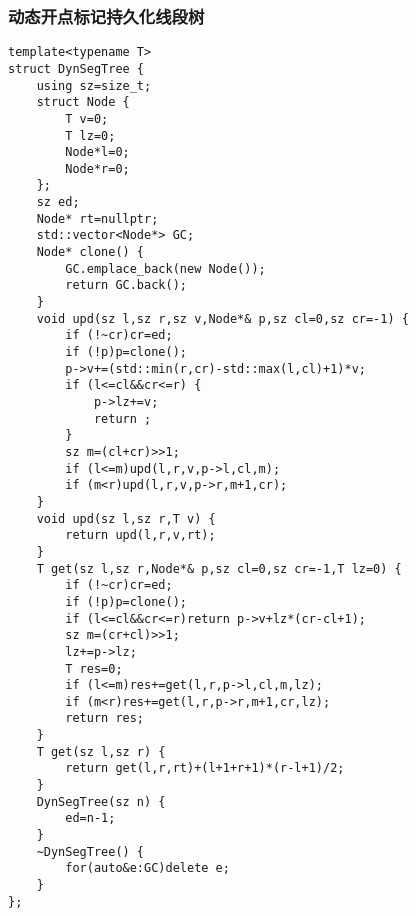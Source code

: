 \documentclass[UTF8]{ctexart}
\begin{document}
\subsubsection{动态开点标记持久化线段树}
\begin{lstlisting}
template<typename T>
struct DynSegTree {
    using sz=size_t;
    struct Node {
        T v=0;
        T lz=0;
        Node*l=0;
        Node*r=0;
    };
    sz ed;
    Node* rt=nullptr;
    std::vector<Node*> GC;
    Node* clone() {
        GC.emplace_back(new Node());
        return GC.back();
    }
    void upd(sz l,sz r,sz v,Node*& p,sz cl=0,sz cr=-1) {
        if (!~cr)cr=ed;
        if (!p)p=clone();
        p->v+=(std::min(r,cr)-std::max(l,cl)+1)*v;
        if (l<=cl&&cr<=r) {
            p->lz+=v;
            return ;
        }
        sz m=(cl+cr)>>1;
        if (l<=m)upd(l,r,v,p->l,cl,m);
        if (m<r)upd(l,r,v,p->r,m+1,cr);
    }
    void upd(sz l,sz r,T v) {
        return upd(l,r,v,rt);
    }
    T get(sz l,sz r,Node*& p,sz cl=0,sz cr=-1,T lz=0) {
        if (!~cr)cr=ed;
        if (!p)p=clone();
        if (l<=cl&&cr<=r)return p->v+lz*(cr-cl+1);
        sz m=(cr+cl)>>1;
        lz+=p->lz;
        T res=0;
        if (l<=m)res+=get(l,r,p->l,cl,m,lz);
        if (m<r)res+=get(l,r,p->r,m+1,cr,lz);
        return res;
    }
    T get(sz l,sz r) {
        return get(l,r,rt)+(l+1+r+1)*(r-l+1)/2;
    }
    DynSegTree(sz n) {
        ed=n-1;
    }
    ~DynSegTree() {
        for(auto&e:GC)delete e;
    }
};
\end{lstlisting}
\end{document}
